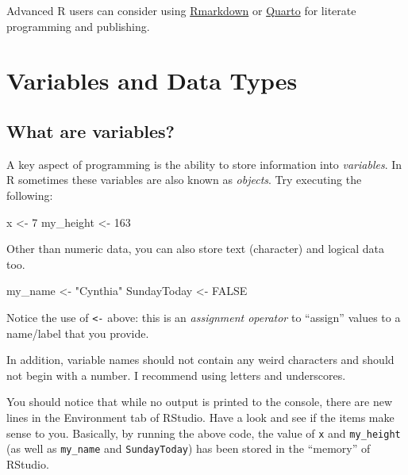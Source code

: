 \documentclass[
]{book}
\newenvironment{Shaded}{\begin{snugshade}}{\end{snugshade}}
\newcommand{\ConstantTok}[1]{\textcolor[rgb]{0.56,0.35,0.01}{#1}}
\newcommand{\DecValTok}[1]{\textcolor[rgb]{0.00,0.00,0.81}{#1}}
\newcommand{\NormalTok}[1]{#1}
\newcommand{\OtherTok}[1]{\textcolor[rgb]{0.56,0.35,0.01}{#1}}
\newcommand{\StringTok}[1]{\textcolor[rgb]{0.31,0.60,0.02}{#1}}
\begin{document}
Advanced R users can consider using \href{https://rmarkdown.rstudio.com/articles_intro.html}{Rmarkdown} or \href{https://quarto.org/}{Quarto} for literate programming and publishing.

\section{Variables and Data Types}\label{variables-and-data-types}

\subsection{What are variables?}\label{what-are-variables}

A key aspect of programming is the ability to store information into \emph{variables}. In R sometimes these variables are also known as \emph{objects}. Try executing the following:

\begin{Shaded}
\begin{Highlighting}[]
\NormalTok{x }\OtherTok{\textless{}{-}} \DecValTok{7}
\NormalTok{my\_height }\OtherTok{\textless{}{-}} \DecValTok{163}
\end{Highlighting}
\end{Shaded}

Other than numeric data, you can also store text (character) and logical data too.

\begin{Shaded}
\begin{Highlighting}[]
\NormalTok{my\_name }\OtherTok{\textless{}{-}} \StringTok{"Cynthia"}
\NormalTok{SundayToday }\OtherTok{\textless{}{-}} \ConstantTok{FALSE}
\end{Highlighting}
\end{Shaded}

Notice the use of \texttt{\textless{}-} above: this is an \emph{assignment operator} to ``assign'' values to a name/label that you provide.

In addition, variable names should not contain any weird characters and should not begin with a number. I recommend using letters and underscores.

You should notice that while no output is printed to the console, there are new lines in the Environment tab of RStudio. Have a look and see if the items make sense to you. Basically, by running the above code, the value of \texttt{x} and \texttt{my\_height} (as well as \texttt{my\_name} and \texttt{SundayToday}) has been stored in the ``memory'' of RStudio.
\end{document}
